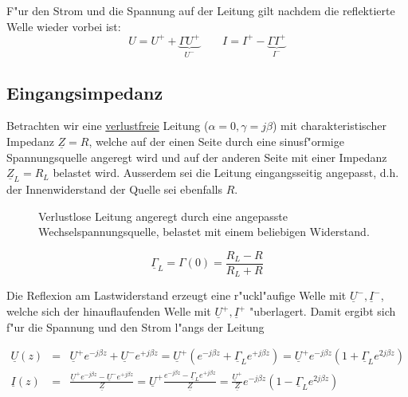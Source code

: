 \documentclass[german, 10pt, a4paper, headsepline]{scrreprt}
\theoremstyle{remark}
\begin{document}
F"ur den Strom und die Spannung auf der Leitung gilt nachdem die reflektierte Welle wieder vorbei ist:
\begin{displaymath}
	U = U^+ + \underbrace{\Gamma U^+}_{U^-} \qquad I = I^+ - \underbrace{\Gamma I^+}_{I^-}
\end{displaymath}

\subsection{Eingangsimpedanz}

Betrachten wir eine \underline{verlustfreie} Leitung ($\alpha = 0, \gamma = j\beta$) mit charakteristischer Impedanz $\underline{Z} = R$, welche auf der einen Seite durch eine sinusf"ormige Spannungsquelle angeregt wird und auf der anderen Seite mit einer Impedanz $\underline{Z}_L = R_L$ belastet wird. Ausserdem sei die Leitung eingangsseitig angepasst, d.h. der Innenwiderstand der Quelle sei ebenfalls $R$.

\begin{figure}[hbt]
 
 \centerline{\box\graph}
 \caption{Verlustlose Leitung angeregt durch eine angepasste Wechselspannungsquelle, belastet mit einem beliebigen Widerstand.}
 \label{eingangsimpedanz}
\end{figure}

\begin{displaymath}
	\underline{\Gamma}_L = \Gamma (0) = \frac{R_L - R}{R_L + R}
\end{displaymath}

Die Reflexion am Lastwiderstand erzeugt eine r"uckl"aufige Welle mit $\underline{U}^-, \underline{I}^-$, welche sich der hinauflaufenden Welle mit $\underline{U}^+, \underline{I}^+$ "uberlagert. Damit ergibt sich f"ur die Spannung und den Strom l"angs der Leitung

\begin{eqnarray}
	\underline{U}(z) &	= &	\underline{U}^+ e^{-j\beta z} + \underline{U}^- e^{+j\beta z} = \underline{U}^+(e^{-j\beta z}+\underline{\Gamma}_L e^{+j\beta z}) = \underline{U}^+ e^{-j\beta z}(1+\underline{\Gamma}_L e^{2j\beta z}) \nonumber \\
	\underline{I}(z) &	= &	\frac{\underline{U}^+ e^{-j\beta z} - \underline{U}^- e^{+j\beta z}}{\underline{Z}} = \underline{U}^+\frac{e^{-j\beta z}-\underline{\Gamma}_L e^{+j\beta z}}{\underline{Z}} = \frac{\underline{U}^+}{\underline{Z}} e^{-j\beta z}(1-\underline{\Gamma}_L e^{2j\beta z}) \nonumber
\end{eqnarray}
\end{document}
